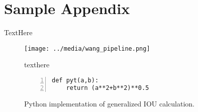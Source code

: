 \section{Sample Appendix}
TextHere

\begin{figure}[h] %
    \texttt{[image: ../media/wang\_pipeline.png]}
    \caption{texthere}
    \label{delme_figure} %
\end{figure}


\begin{figure}[h] %
\begin{lstlisting}[numbers=left]
def pyt(a,b):
    return (a**2+b**2)**0.5
\end{lstlisting}
\onehalfspacing %
\caption{Python implementation of generalized IOU calculation.}
\label{delme_code} %
\end{figure}
